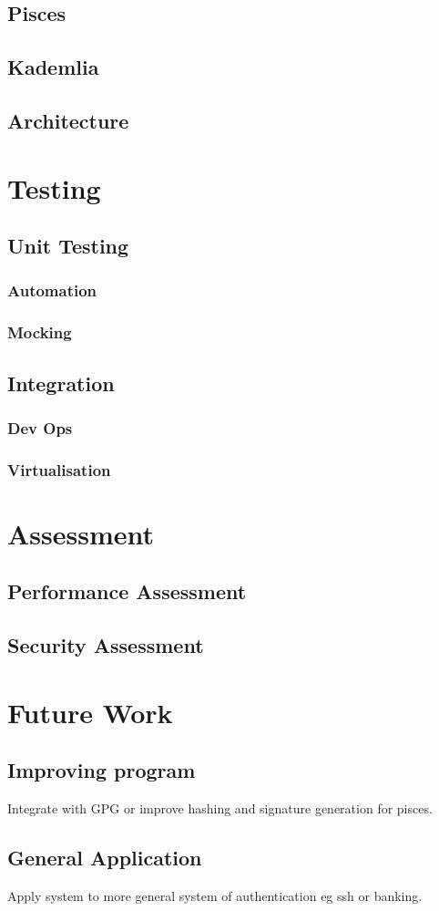 \documentclass[12pt, a4paper]{article}
\begin{document}
\subsection{Pisces}
\subsection{Kademlia}
\subsection{Architecture}
\section{Testing}
\subsection{Unit Testing}
\subsubsection{Automation}
\subsubsection{Mocking}
\subsection{Integration}
\subsubsection{Dev Ops}
\subsubsection{Virtualisation}
\section{Assessment}
\subsection{Performance Assessment}
\subsection{Security Assessment}
\section{Future Work}
\subsection{Improving program}
Integrate with GPG or improve hashing and signature generation for pisces.
\subsection{General Application}
Apply system to more general system of authentication eg ssh or banking.
\end{document}
